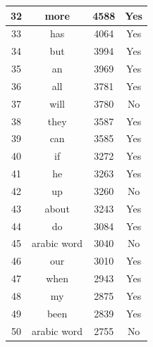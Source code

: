 \begin{table}
\begin{center}
\begin{tabular}{ c | c | c | c}
32 & more & 4588 & Yes \\ \hline
33 & has & 4064 & Yes \\ \hline
34 & but & 3994 & Yes \\ \hline
35 & an & 3969 & Yes \\ \hline
36 & all & 3781 & Yes \\ \hline
37 & will & 3780 & No \\ \hline
38 & they & 3587 & Yes \\ \hline
39 & can & 3585 & Yes \\ \hline
40 & if & 3272 & Yes \\ \hline
41 & he & 3263 & Yes \\ \hline
42 & up & 3260 & No \\ \hline
43 & about & 3243 & Yes \\ \hline
44 & do & 3084 & Yes \\ \hline
45 & arabic word & 3040 & No \\ \hline
46 & our & 3010 & Yes \\ \hline
47 & when & 2943 & Yes \\ \hline
48 & my & 2875 & Yes \\ \hline
49 & been & 2839 & Yes \\ \hline
50 & arabic word & 2755 & No \\ \hline
\hline

\end{tabular}
\end{center}
\end{table} ​


